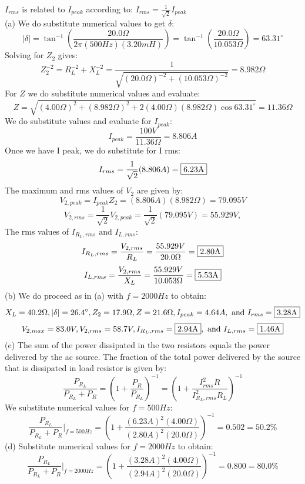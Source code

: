 \documentclass{report}
\begin{document}
$I_{rms}$ is related to $I_{peak}$ according to: $I_{rms} = \frac{1}{\sqrt{2}}I_{peak}$\\
(a) We do substitute numerical values to get $\delta$:
$$\lvert \delta \rvert = \tan^{-1} \left( \frac{20.0\Omega}{2\pi (500Hz)(3.20mH)} \right) = \tan^{-1}\left( \frac{20.0\Omega}{10.053\Omega} \right) = 63.31^{\circ}$$
Solving for $Z_2$ gives:
$$Z_2^{-2} = R_L^{-2} + X_L^{-2} = \frac{1}{\sqrt{(20.0\Omega)^{-2}+(10.053\Omega)^{-2}}} = 8.982\Omega$$
For $Z$ we do substitute numerical values and evaluate:
$$Z = \sqrt{(4.00\Omega)^2 + (8.982\Omega)^2 + 2(4.00\Omega)(8.982\Omega)\cos 63.31^{\circ}} = 11.36\Omega$$
We do substitute values and evaluate for $I_{peak}$:
$$I_{peak} = \frac{100V}{11.36\Omega} = 8.806A$$
Once we have I peak, we do substitute for I rms:
$$I_{rms} = \frac{1}{\sqrt{2}}(8.806A) = \fbox{6.23A}$$
The maximum and rms values of $V_2$ are given by:
$$V_{2,peak} = I_{peak}Z_2 = (8.806A)(8.982\Omega) = 79.095V$$
$$V_{2,rms} = \frac{1}{\sqrt{2}}V_{2,peak} = \frac{1}{\sqrt{2}}(79.095V) = 55.929V,$$
The rms values of $I_{R_L,rms} \text{ and } I_{L,rms}$:
$$I_{R_L,rms} = \frac{V_{2,rms}}{R_L} = \frac{55.929V}{20.0\Omega} = \fbox{2.80A}$$
$$I_{L,rms} = \frac{V_{2,rms}}{X_L} = \frac{55.929V}{10.053\Omega} = \fbox{5.53A}$$
(b) We do proceed as in (a) with $f = 2000Hz$ to obtain:
$$X_L = 40.2\Omega, \lvert \delta \rvert = 26.4^{\circ}, Z_2 = 17.9\Omega , Z = 21.6\Omega , I_{peak} = 4.64A, \text{ and } I_{rms} = \fbox{3.28A}$$
$$V_{2,max} = 83.0V, V_{2,rms} = 58.7V, I_{R_L,rms} = \fbox{2.94A}, \text{ and } I_{L,rms} = \fbox{1.46A}$$
(c) The sum of the power dissipated in the two resistors equals the power delivered by the ac source. The fraction of the total power delivered by the source that is dissipated in load resistor is given by:
$$\frac{P_{R_L}}{P_{R_L} + P_R} = \left( 1 + \frac{P_R}{P_{R_L}} \right)^{-1} = \left( 1 + \frac{I_{rms}^2 R}{I_{R_L,rms}^2 R_L}\right)^{-1}$$
We substitute numerical values for $f = 500 Hz$:
$$\frac{P_{R_L}}{P_{R_L} + P_R}\bigg|_{f=500Hz} = \left( 1 + \frac{(6.23A)^2(4.00\Omega)}{(2.80A)^2(20.0\Omega)} \right)^{-1} = 0.502 = 50.2 \%$$
(d) Substitute numerical values for $f = 2000 Hz$ to obtain:
$$\frac{P_{R_L}}{P_{R_L} + P_R}\bigg|_{f=2000Hz} = \left( 1 + \frac{(3.28A)^2(4.00\Omega)}{(2.94A)^2(20.0\Omega)} \right)^{-1} = 0.800 = 80.0\%$$
\end{document}
